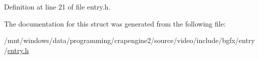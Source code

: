 Definition at line 21 of file entry.\+h.



The documentation for this struct was generated from the following file\+:\begin{DoxyCompactItemize}
\item 
/mnt/windows/data/programming/crapengine2/source/video/include/bgfx/entry/\hyperlink{entry_8h}{entry.\+h}\end{DoxyCompactItemize}
